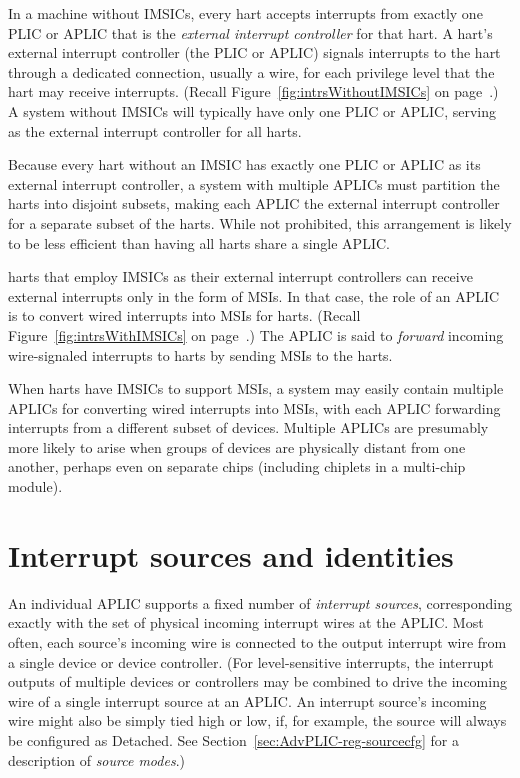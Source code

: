 In a machine without IMSICs, every {\RISCV} hart accepts interrupts
from exactly one PLIC or APLIC that is the \emph{external interrupt controller}
for that hart.
A hart's external interrupt controller (the PLIC or APLIC) signals interrupts
to the hart through a dedicated connection, usually a wire, for each
privilege level that the hart may receive interrupts.
(Recall Figure~\ref{fig:intrsWithoutIMSICs} on
page~\pageref{fig:intrsWithoutIMSICs}.)
A system without IMSICs will typically have only one PLIC or APLIC, serving as
the external interrupt controller for all {\RISCV} harts.

\begin{commentary}
Because every {\RISCV} hart without an IMSIC has exactly one PLIC or APLIC
as its external interrupt controller, a system with multiple APLICs
must partition the harts into disjoint subsets, making each APLIC the
external interrupt controller for a separate subset of the harts.
While not prohibited, this arrangement is likely to be less efficient
than having all harts share a single APLIC.
\end{commentary}

{\RISCV} harts that employ IMSICs as their external interrupt
controllers can receive external interrupts only in the form of MSIs.
In that case, the role of an APLIC is to convert wired interrupts into
MSIs for harts.
(Recall Figure~\ref{fig:intrsWithIMSICs} on
page~\pageref{fig:intrsWithIMSICs}.)
The APLIC is said to \emph{forward} incoming wire-signaled interrupts to
harts by sending MSIs to the harts.

When harts have IMSICs to support MSIs, a system may easily contain
multiple APLICs for converting wired interrupts into MSIs, with each
APLIC forwarding interrupts from a different subset of devices.
Multiple APLICs are presumably more likely to arise when groups of
devices are physically distant from one another, perhaps even on
separate chips (including chiplets in a multi-chip module).

\section{Interrupt sources and identities}

An individual APLIC supports a fixed number of \emph{interrupt sources},
corresponding exactly with the set of physical incoming interrupt
wires at the APLIC.
Most often, each source's incoming wire is connected to the output
interrupt wire from a single device or device controller.
(For level-sensitive interrupts, the interrupt outputs of multiple
devices or controllers may be combined to drive the incoming wire of a
single interrupt source at an APLIC.
An interrupt source's incoming wire might also be simply tied high or
low, if, for example, the source will always be configured as Detached.
See Section~\ref{sec:AdvPLIC-reg-sourcecfg} for a description of
\emph{source modes}.)

